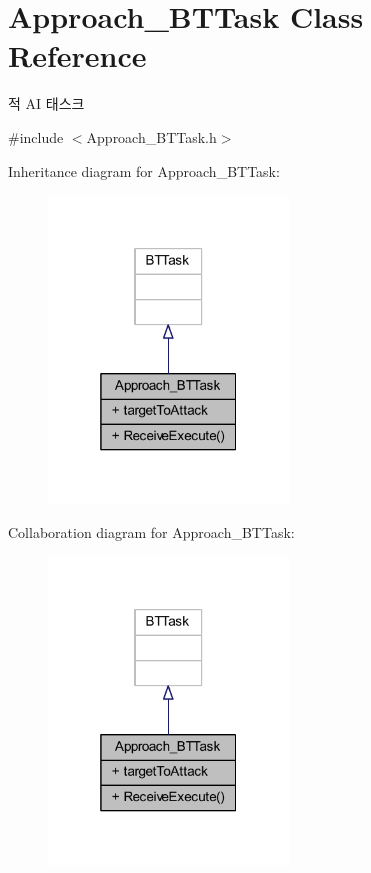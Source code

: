 \hypertarget{class_approach___b_t_task}{}\section{Approach\+\_\+\+B\+T\+Task Class Reference}
\label{class_approach___b_t_task}


적 AI 태스크  




{\ttfamily \#include $<$Approach\+\_\+\+B\+T\+Task.\+h$>$}



Inheritance diagram for Approach\+\_\+\+B\+T\+Task\+:
\nopagebreak
\begin{figure}[H]
\begin{center}
\leavevmode
\includegraphics[width=181pt]{class_approach___b_t_task__inherit__graph}
\end{center}
\end{figure}


Collaboration diagram for Approach\+\_\+\+B\+T\+Task\+:
\nopagebreak
\begin{figure}[H]
\begin{center}
\leavevmode
\includegraphics[width=181pt]{class_approach___b_t_task__coll__graph}
\end{center}
\end{figure}
